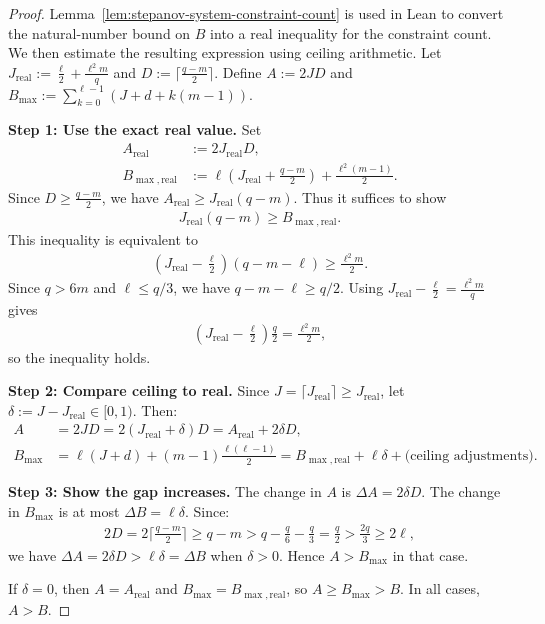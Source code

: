 \begin{proof} \leanok
  Lemma~\ref{lem:stepanov-system-constraint-count} is used in Lean to convert the natural-number bound on $B$ into a real inequality for the constraint count. We then estimate the resulting expression using ceiling arithmetic.
  Let $J_{\text{real}} := \frac{\ell}{2} + \frac{\ell^2 m}{q}$ and $D := \lceil\frac{q-m}{2}\rceil$. Define $A := 2JD$ and $B_{\max} := \sum_{k=0}^{\ell-1}(J + d + k(m-1))$.

  \textbf{Step 1: Use the exact real value.} Set
  \begin{align*}
    A_{\text{real}}      & := 2 J_{\text{real}} D,                                             \\
    B_{\max,\text{real}} & := \ell(J_{\text{real}} + \tfrac{q-m}{2}) + \tfrac{\ell^2(m-1)}{2}.
  \end{align*}
  Since $D \ge \frac{q-m}{2}$, we have $A_{\text{real}} \ge J_{\text{real}}(q-m)$. Thus it suffices to show
  \begin{align*}
    J_{\text{real}}(q-m) \ge B_{\max,\text{real}}.
  \end{align*}
  This inequality is equivalent to
  \begin{align*}
    (J_{\text{real}} - \tfrac{\ell}{2})(q-m-\ell) \ge \tfrac{\ell^2 m}{2}.
  \end{align*}
  Since $q > 6m$ and $\ell \leq q/3$, we have $q-m-\ell \geq q/2$. Using $J_{\text{real}} - \tfrac{\ell}{2} = \tfrac{\ell^2 m}{q}$ gives
  \begin{align*}
    (J_{\text{real}} - \tfrac{\ell}{2})\tfrac{q}{2} = \tfrac{\ell^2 m}{2},
  \end{align*}
  so the inequality holds.

  \textbf{Step 2: Compare ceiling to real.} Since $J = \lceil J_{\text{real}} \rceil \geq J_{\text{real}}$, let $\delta := J - J_{\text{real}} \in [0, 1)$. Then:
  \begin{align*}
    A        & = 2JD = 2(J_{\text{real}} + \delta)D = A_{\text{real}} + 2\delta D,                                             \\
    B_{\max} & = \ell(J + d) + (m-1)\frac{\ell(\ell-1)}{2} = B_{\max,\text{real}} + \ell\delta + \text{(ceiling adjustments)}.
  \end{align*}

  \textbf{Step 3: Show the gap increases.} The change in $A$ is $\Delta A = 2\delta D$. The change in $B_{\max}$ is at most $\Delta B = \ell\delta$. Since:
  \begin{align*}
    2D = 2\lceil\tfrac{q-m}{2}\rceil \geq q - m > q - \tfrac{q}{6} - \tfrac{q}{3} = \tfrac{q}{2} > \tfrac{2q}{3} \geq 2\ell,
  \end{align*}
  we have $\Delta A = 2\delta D > \ell\delta = \Delta B$ when $\delta > 0$. Hence $A > B_{\max}$ in that case.

  If $\delta = 0$, then $A = A_{\text{real}}$ and $B_{\max} = B_{\max,\text{real}}$, so $A \ge B_{\max} > B$. In all cases, $A > B$.
\end{proof}

